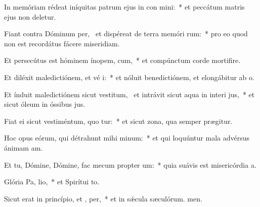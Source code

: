\item In memóriam rédeat iníquitas patrum ejus in con mini:~* et peccátum matris ejus non deletur.
\item Fiant contra Dóminum per,~\pscross{} et dispéreat de terra memóri rum:~* pro eo quod non est recordátus fácere miseridiam.
\item Et persecútus est hóminem ínopem,  cum,~* et compúnctum corde mortifire.
\item Et diléxit maledictiónem, et vé i:~* et nóluit benedictiónem, et elongábitur ab o.
\item Et índuit maledictiónem sicut vestitum,~\pscross{} et intrávit sicut aqua in interi jus,~* et sicut óleum in óssibus jus.
\item Fiat ei sicut vestiméntum, quo tur:~* et sicut zona, qua semper prægitur.
\item Hoc opus eórum, qui détrahunt mihi  minum:~* et qui loquúntur mala advérsus ánimam am.
\item Et tu, Dómine, Dómine, fac mecum propter  um:~* quia suávis est misericórdia a.
\item Glória Pa,  lio,~* et Spirítui to.
\item Sicut erat in princípio, et ,  per,~* et in sǽcula sæculórum. men.
